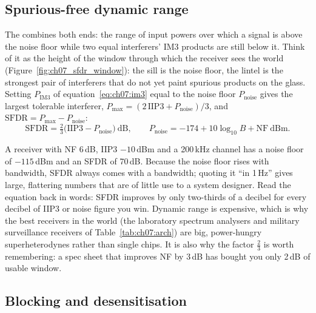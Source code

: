 \subsection{Spurious-free dynamic range}

The  combines both ends: the range of input powers over which a signal
is above the noise floor while two equal interferers' IM3 products are still below it. Think of it as
the height of the window through which the receiver sees the world (Figure~\ref{fig:ch07_sfdr_window}):
the sill is the noise floor, the lintel is the strongest pair of interferers that do not yet paint
spurious products on the glass. Setting $P_{\text{IM3}}$ of equation~\eqref{eq:ch07:im3} equal to the
noise floor $P_{\text{noise}}$ gives the largest tolerable interferer,
$P_{\text{max}}=(2\,\text{IIP3}+P_{\text{noise}})/3$, and $\text{SFDR}=P_{\text{max}}-P_{\text{noise}}$:
\begin{equation}
\text{SFDR}=\tfrac23\big(\text{IIP3}-P_{\text{noise}}\big)\ \text{dB},
\qquad P_{\text{noise}}=-174+10\log_{10}B+\text{NF}\ \text{dBm}.
\label{eq:ch07:sfdr}
\end{equation}


A receiver with NF 6\,dB, IIP3 $-10$\,dBm and a 200\,kHz channel has a noise floor of $-115$\,dBm and
an SFDR of 70\,dB. Because the noise floor rises with bandwidth, SFDR always comes with a bandwidth;
quoting it ``in 1\,Hz'' gives large, flattering numbers that are of little use to a system designer.
Read the equation back in words: SFDR improves by only two-thirds of a decibel for every decibel of
IIP3 or noise figure you win. Dynamic range is expensive, which is why the best receivers in the world
(the laboratory spectrum analysers and military surveillance receivers of
Table~\ref{tab:ch07:arch}) are big, power-hungry superheterodynes rather than single chips. It is also
why the factor $\tfrac23$ is worth remembering: a spec sheet that improves NF by 3\,dB has bought you
only 2\,dB of usable window.

\subsection{Blocking and desensitisation}

